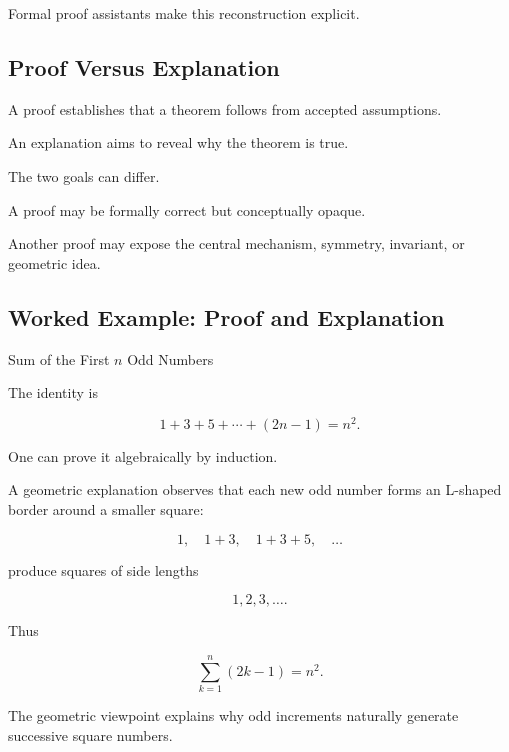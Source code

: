 Formal proof assistants make this reconstruction explicit.

\subsection{Proof Versus Explanation}
\label{subsec:proof-versus-explanation}

A proof establishes that a theorem follows from accepted assumptions.

An explanation aims to reveal why the theorem is true.

The two goals can differ.

A proof may be formally correct but conceptually opaque.

Another proof may expose the central mechanism, symmetry, invariant, or
geometric idea.

\subsection{Worked Example: Proof and Explanation}
\label{subsec:worked-proof-explanation}

\begin{workedexamplebox}{Sum of the First \(n\) Odd Numbers}

The identity is

\[
1+3+5+\cdots+(2n-1)=n^2.
\]

One can prove it algebraically by induction.

A geometric explanation observes that each new odd number forms an
L-shaped border around a smaller square:

\[
1,
\quad
1+3,
\quad
1+3+5,
\quad\ldots
\]

produce squares of side lengths

\[
1,2,3,\ldots.
\]

Thus

\begin{answerbox}
\[
\boxed{
\sum_{k=1}^{n}(2k-1)=n^2.
}
\]
\end{answerbox}

The geometric viewpoint explains why odd increments naturally generate
successive square numbers.

\end{workedexamplebox}

